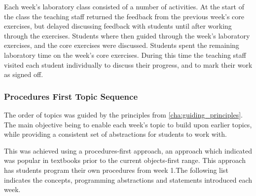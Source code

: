 Each week's laboratory class consisted of a number of activities. At the start of the class the teaching staff returned the feedback from the previous week's core exercises, but delayed discussing feedback with students until after working through the exercises. Students where then guided through the week's laboratory exercises, and the core exercises were discussed. Students spent the remaining laboratory time on the week's core exercises. During this time the teaching staff visited each student individually to discuss their progress, and to mark their work as signed off.


\subsubsection{Procedures First Topic Sequence} %
\label{ssub:procedures_first_topic_sequence}

The order of topics was guided by the principles from \cref{cha:guiding_principles}. The main objective being to enable each week's topic to build upon earlier topics, while providing a consistent set of abstractions for students to work with.

This was achieved using a procedures-first approach, an approach which \citet{Pattis:1990} indicated was popular in textbooks prior to the current objects-first range. This approach has students program their own procedures from week 1.The following list indicates the concepts, programming abstractions and statements introduced each week.

